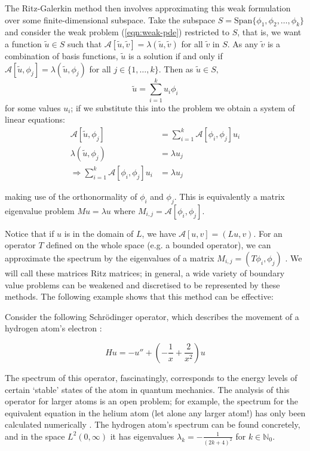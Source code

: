 \documentclass[../main.tex]{subfiles}
\begin{document}
The Ritz-Galerkin method then involves approximating
this weak formulation over some finite-dimensional subspace. Take the subspace
$S = \text{Span}\{\phi_1, \phi_2, \hdots, \phi_k\}$ and consider the weak
problem (\ref{eqn:weak-pde}) restricted to $S$, that is, we want a function
$\tilde{u} \in S$ such that $\mathcal{A}[\tilde{u}, \tilde{v}] = \lambda
(\tilde{u}, \tilde{v})$ for all $\tilde{v}$ in $S$. As any $\tilde{v}$ is a
combination of basis functions, $\tilde{u}$ is a solution if and only if
$\mathcal{A}[\tilde{u}, \phi_j] = \lambda (\tilde{u}, \phi_j)$ for all $j \in
\{1, \hdots, k\}$. Then as $\tilde{u} \in S,$ 
$$\tilde{u} = \sum_{i=1}^k u_i \phi_i$$
for some values $u_i$; if we substitute this into the problem we obtain a system
of linear equations:
\begin{align*}
\mathcal{A}[\tilde{u}, \phi_j] & = \sum_{i=1}^k \mathcal{A}[\phi_i, \phi_j] u_i \\
\lambda (\tilde{u}, \phi_j) & = \lambda u_j \\
\Rightarrow \sum_{i=1}^k \mathcal{A}[\phi_i, \phi_j] u_i & = \lambda u_j
\end{align*}

making use of the orthonormality of $\phi_i$ and $\phi_j$. This is equivalently
a matrix eigenvalue problem $M u = \lambda u$ where $M_{i,j} =
\mathcal{A}[\phi_i, \phi_j]$.

Notice that if $u$ is in the domain of $L$, we have $\mathcal{A}[u, v] = (Lu,
v)$. For an operator $T$ defined on the whole space (e.g. a bounded operator),
we can approximate the spectrum by the eigenvalues of a matrix $M_{i, j} = (T
\phi_i, \phi_j)$ \cite{davies2003spectral}. We will call these matrices Ritz
matrices;  in general, a wide variety of boundary value
problems can be weakened and discretised to be represented by these methods. The
following example shows that this method can be effective:

\begin{example}
\label{ex:schrodinger-ritz}
Consider the following Schr\"odinger operator, which describes the movement of a
hydrogen atom's electron
\cite{pryce1993numerical}:

$$Hu = -u'' + (-\frac{1}{x} + \frac{2}{x^2})u$$
\end{example}

The spectrum of this operator, fascinatingly, corresponds to the energy levels
of certain `stable' states of the atom in quantum mechanics. The analysis of
this operator for larger atoms is an open problem; for example,
the spectrum for the equivalent equation in the helium atom (let alone any
larger atom!) has only been calculated numerically \cite{davies1995spectral}.
The hydrogen atom's spectrum can be found concretely, and in the space $L^2(0,
\infty)$ it has eigenvalues $\lambda_k = -\frac{1}{(2k + 4)^2}$ for $k \in
\mathbb{N}_0$.
\end{document}
